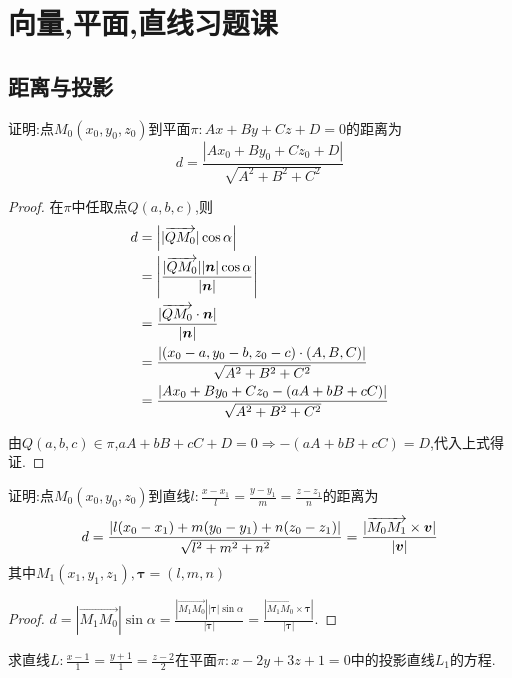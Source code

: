 \setcounter{chapter}{2}
\chapter{向量,平面,直线习题课}

\section{距离与投影}

\begin{example}
    证明:点$M_0(x_0,y_0,z_0)$到平面$\pi:Ax+By+Cz+D=0$的距离为
    $$
    d = \frac{|Ax_0+By_0+Cz_0+D|}{\sqrt{A^2+B^2+C^2}}
    $$
\end{example}

\begin{proof}
    在$\pi$中任取点$Q(a,b,c)$,则
    \begin{align*}
        d &= \left| |\overrightarrow{QM_0}|\cos\alpha \right| \\
        &= \left| \frac{|\overrightarrow{QM_0}| |\bm{n}| \cos \alpha }{|\bm{n}|} \right| \\
        &= \frac{|\overrightarrow{QM_0} \cdot \bm{n}|}{|\bm{n}|} \\
        &= \frac{|(x_0-a, y_0-b, z_0-c) \cdot (A,B,C)|}{\sqrt{A^2+B^2+C^2}} \\
        &= \frac{|Ax_0+By_0+Cz_0 - (aA+bB+cC)|}{\sqrt{A^2+B^2+C^2}} \\
    \end{align*}

    由$Q(a,b,c) \in \pi$,$aA+bB+cC+D = 0 \Rightarrow -(aA+bB+cC) = D$,代入上式得证.
\end{proof}

\begin{example}
    证明:点$M_0(x_0,y_0,z_0)$到直线$l:\frac{x-x_1}{l} = \frac{y-y_1}{m} = \frac{z-z_1}{n}$的距离为
    $$
    d = \frac{|l(x_0-x_1)+m(y_0-y_1)+n(z_0-z_1)|}{\sqrt{l^2+m^2+n^2}} = \frac{|\overrightarrow{M_0 M_1} \times \bm{v}|}{|\bm{v}|}
    $$
    其中$M_1(x_1,y_1,z_1),\bm{\tau} = (l,m,n)$

\end{example}

\begin{proof}
    $d = |\overrightarrow{M_1 M_0} |\sin \alpha = \frac{|\overrightarrow{M_1 M_0}| | \bm{\tau} | \sin \alpha }{|\bm{\tau}|} = \frac{|\overrightarrow{M_1 M_0}  \times \bm \tau |}{|\bm \tau|}$.
\end{proof}

\begin{example}
    求直线$L: \frac{x-1}{1} = \frac{y+1}{1} = \frac{z-2}{2}$在平面$\pi: x-2y+3z+1 = 0$中的投影直线$L_1$的方程.
\end{example}

